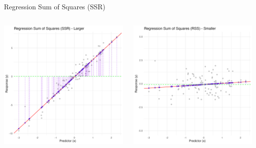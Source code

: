 \documentclass{beamer}
\begin{document}
\begin{frame}{Regression Sum of Squares (SSR)}
    \begin{columns}
        \begin{column}{0.5\linewidth}
            \includegraphics[width=\linewidth]{figures/ssr.png}
        \end{column}
        \begin{column}{0.5\linewidth}
            \includegraphics[width=\linewidth]{figures/ssr_small.png}
        \end{column}
    \end{columns}
\end{frame}
\end{document}

